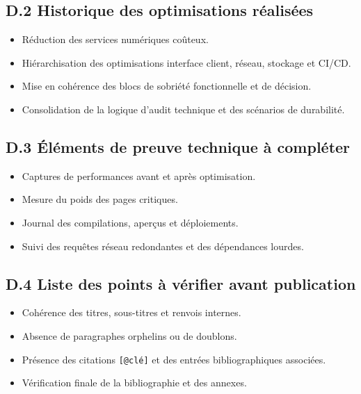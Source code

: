 \documentclass[
  10pt,
  a4paper,
  DIV=11,
  numbers=noendperiod,
  oneside]{scrreprt}
\providecommand{\tightlist}{%
  \setlength{\itemsep}{0pt}\setlength{\parskip}{0pt}}
\begin{document}
\subsection{D.2 Historique des optimisations
réalisées}\label{d.2-historique-des-optimisations-ruxe9alisuxe9es}

\begin{itemize}
\tightlist
\item
  Réduction des services numériques coûteux.
\item
  Hiérarchisation des optimisations interface client, réseau, stockage
  et CI/CD.
\item
  Mise en cohérence des blocs de sobriété fonctionnelle et de décision.
\item
  Consolidation de la logique d'audit technique et des scénarios de
  durabilité.
\end{itemize}

\subsection{D.3 Éléments de preuve technique à
compléter}\label{d.3-uxe9luxe9ments-de-preuve-technique-uxe0-compluxe9ter}

\begin{itemize}
\tightlist
\item
  Captures de performances avant et après optimisation.
\item
  Mesure du poids des pages critiques.
\item
  Journal des compilations, aperçus et déploiements.
\item
  Suivi des requêtes réseau redondantes et des dépendances lourdes.
\end{itemize}

\subsection{D.4 Liste des points à vérifier avant
publication}\label{d.4-liste-des-points-uxe0-vuxe9rifier-avant-publication}

\begin{itemize}
\tightlist
\item
  Cohérence des titres, sous-titres et renvois internes.
\item
  Absence de paragraphes orphelins ou de doublons.
\item
  Présence des citations \texttt{{[}@clé{]}} et des entrées
  bibliographiques associées.
\item
  Vérification finale de la bibliographie et des annexes.
\end{itemize}
\end{document}
